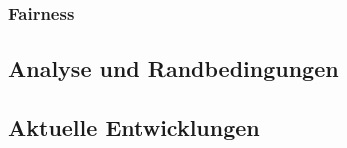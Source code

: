 \subsubsection{Fairness}


\subsection{Analyse und Randbedingungen}


\subsection{Aktuelle Entwicklungen}
